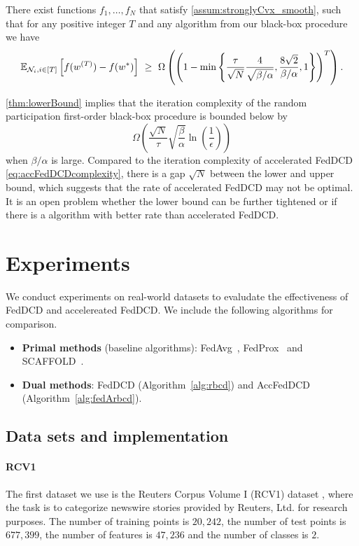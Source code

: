 \begin{theorem} \label{thm:lowerBound}
    There exist functions $f_1, \dots, f_N$ that satisfy \autoref{assum:stronglyCvx_smooth}, such that for any positive integer $T$ and any algorithm from our black-box procedure we have
    \[\mathbb{E}_{ \mathcal{N}_i, i \in [T] } \left[ f( w^{(T)} ) - f(w^*) \right]  ~\geq~ \Omega \left( \left( 1 - \min\left\{ \frac{\tau}{\sqrt{N}} \frac{4}{ \sqrt{ \beta/\alpha }}, \frac{8 \sqrt{2} }{\beta/\alpha} , 1\right\} \right)^T \right).\]
\end{theorem}

\autoref{thm:lowerBound} implies that the iteration complexity of the random participation first-order black-box procedure is bounded below by
\[
    \Omega \left( \frac{\sqrt{N}}{\tau} \sqrt{ \frac{\beta}{\alpha} } \ln\left( \frac{1}{\epsilon} \right) \right)
\]
when $\beta/\alpha$ is large. Compared to the iteration complexity of accelerated FedDCD \eqref{eq:accFedDCDcomplexity}, there is a gap $\sqrt{N}$ between the lower and upper bound, which suggests that the rate of accelerated FedDCD may not be optimal. It is an open problem whether the lower bound can be further tightened or if there is a algorithm with better rate than accelerated FedDCD.


\section{Experiments}
\label{sec:experiments}

We conduct experiments on real-world datasets to evaludate the effectiveness of FedDCD and accelereated FedDCD. We include the following algorithms for comparison. 
\begin{itemize}
    \item \textbf{Primal methods} (baseline algorithms): FedAvg~\citep{mcmahan2017communication}, FedProx~\citep{li2018federated} and SCAFFOLD~\citep{pmlr-v119-karimireddy20a}. 
    \item \textbf{Dual methods}: FedDCD (Algorithm~\ref{alg:rbcd}) and AccFedDCD (Algorithm~\ref{alg:fedArbcd}).
\end{itemize}

\subsection{Data sets and implementation} \label{sec:details}
\paragraph{RCV1} The first dataset we use is the Reuters Corpus Volume I (RCV1) dataset \citep{lewis2004rcv1}, where the task is to categorize newswire
stories provided by Reuters, Ltd. for research purposes. The number of training points is $20,242$, the number of test points is $677,399$, the number of features is $47,236$ and the number of classes is $2$.

